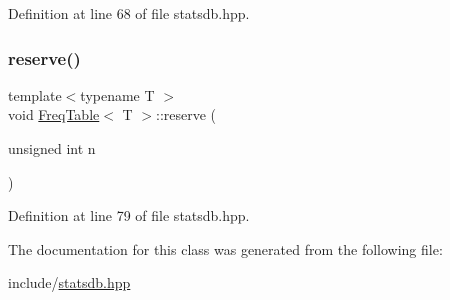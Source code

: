 Definition at line 68 of file statsdb.\+hpp.

\mbox{\label{class_freq_table_a0bdced25f7c0bee38e073c4654578d19}} 
\subsubsection{\texorpdfstring{reserve()}{reserve()}}
{\footnotesize\ttfamily template$<$typename T $>$ \\
void \hyperlink{class_freq_table}{Freq\+Table}$<$ T $>$\+::reserve (\begin{DoxyParamCaption}\item[{unsigned int}]{n }\end{DoxyParamCaption})\hspace{0.3cm}{\ttfamily [inline]}}



Definition at line 79 of file statsdb.\+hpp.



The documentation for this class was generated from the following file\+:\begin{DoxyCompactItemize}
\item 
include/\hyperlink{statsdb_8hpp}{statsdb.\+hpp}\end{DoxyCompactItemize}
